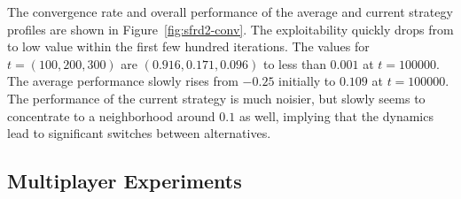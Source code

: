 \documentclass{aamas2014}
\begin{document}
The convergence rate and overall performance of the average and current strategy profiles are shown in
Figure~\ref{fig:sfrd2-conv}. The exploitability quickly drops from to low value within the first few hundred iterations. 
The values for $t = (100,200,300)$ are $(0.916, 0.171, 0.096)$ to less than $0.001$ at $t = 100000$. 
The average performance slowly rises from $-0.25$ initially to $0.109$ at $t = 100000$. The performance of the 
current strategy is much noisier, but slowly seems to concentrate to a neighborhood around $0.1$ as well, implying that the 
dynamics lead to significant switches between alternatives. 

\subsection{Multiplayer Experiments}
\end{document}
